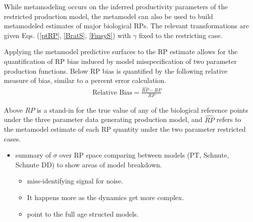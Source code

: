 \documentclass[12pt]{article}
\begin{document}
%
While metamodeling occurs on the inferred productivity parameters of the 
restricted production model, the metamodel can also be used to build 
metamodeled estimates of major biological RPs. The relevant transformations 
are given Eqs. (\ref{ptRP}, \ref{BratS}, \ref{FmsyS}) with $\gamma$ 
fixed to the restricting case. 


%
Applying the metamodel predictive surfaces to the RP estimate allows for the 
quantification of RP bias induced by model misspecification of two parameter 
production functions. Below RP bias is quantified by the following relative 
measure of bias, similar to a percent error calculation.
%
\begin{align}
\text{Relative Bias} = \frac{\hat{RP}-RP}{RP}
\end{align}

%
Above $RP$ is a stand-in for the true value of any of the biological
reference points under the three parameter data generating production model, 
and $\hat{RP}$ refers to the metamodel estimate of each RP quantity under the 
two parameter restricted cases.



\begin{itemize}
\item summary of $\sigma$ over RP space comparing between models (PT, Schnute, Schnute DD) to show areas of model breakdown.
	\begin{itemize}
	\item miss-identifying signal for noise. 
	\item It happens more as the dynamics get more complex. 
	\item point to the full age structed models.
	\end{itemize}

\end{itemize}
\end{document}
